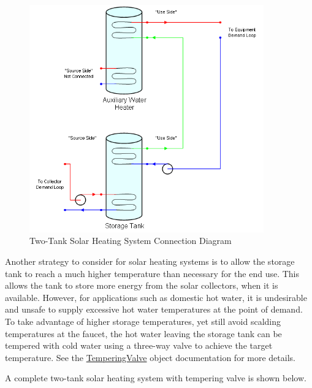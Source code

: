 \begin{figure}[hbtp] %
\centering
\includegraphics[width=0.9\textwidth, height=0.9\textheight, keepaspectratio=true]{media/image340.png}
\caption{Two-Tank Solar Heating System Connection Diagram \protect \label{fig:two-tank-solar-heating-system-connection}}
\end{figure}

Another strategy to consider for solar heating systems is to allow the storage tank to reach a much higher temperature than necessary for the end use. This allows the tank to store more energy from the solar collectors, when it is available. However, for applications such as domestic hot water, it is undesirable and unsafe to supply excessive hot water temperatures at the point of demand. To take advantage of higher storage temperatures, yet still avoid scalding temperatures at the faucet, the hot water leaving the storage tank can be tempered with cold water using a three-way valve to achieve the target temperature. See the \hyperref[temperingvalve]{TemperingValve} object documentation for more details.

A complete two-tank solar heating system with tempering valve is shown below.


